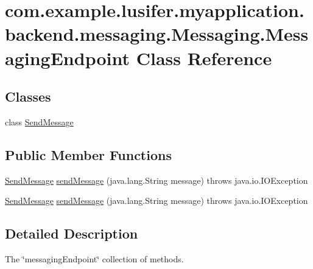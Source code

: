\hypertarget{classcom_1_1example_1_1lusifer_1_1myapplication_1_1backend_1_1messaging_1_1_messaging_1_1_messaging_endpoint}{}\section{com.\+example.\+lusifer.\+myapplication.\+backend.\+messaging.\+Messaging.\+Messaging\+Endpoint Class Reference}
\label{classcom_1_1example_1_1lusifer_1_1myapplication_1_1backend_1_1messaging_1_1_messaging_1_1_messaging_endpoint}
\subsection*{Classes}
\begin{DoxyCompactItemize}
\item 
class \hyperlink{classcom_1_1example_1_1lusifer_1_1myapplication_1_1backend_1_1messaging_1_1_messaging_1_1_messaging_endpoint_1_1_send_message}{Send\+Message}
\end{DoxyCompactItemize}
\subsection*{Public Member Functions}
\begin{DoxyCompactItemize}
\item 
\hyperlink{classcom_1_1example_1_1lusifer_1_1myapplication_1_1backend_1_1messaging_1_1_messaging_1_1_messaging_endpoint_1_1_send_message}{Send\+Message} \hyperlink{classcom_1_1example_1_1lusifer_1_1myapplication_1_1backend_1_1messaging_1_1_messaging_1_1_messaging_endpoint_ad2abc3d441f43d4fb784ab574ad40950}{send\+Message} (java.\+lang.\+String message)  throws java.\+io.\+I\+O\+Exception 
\item 
\hyperlink{classcom_1_1example_1_1lusifer_1_1myapplication_1_1backend_1_1messaging_1_1_messaging_1_1_messaging_endpoint_1_1_send_message}{Send\+Message} \hyperlink{classcom_1_1example_1_1lusifer_1_1myapplication_1_1backend_1_1messaging_1_1_messaging_1_1_messaging_endpoint_ad2abc3d441f43d4fb784ab574ad40950}{send\+Message} (java.\+lang.\+String message)  throws java.\+io.\+I\+O\+Exception 
\end{DoxyCompactItemize}


\subsection{Detailed Description}
The \char`\"{}messaging\+Endpoint\char`\"{} collection of methods. 

